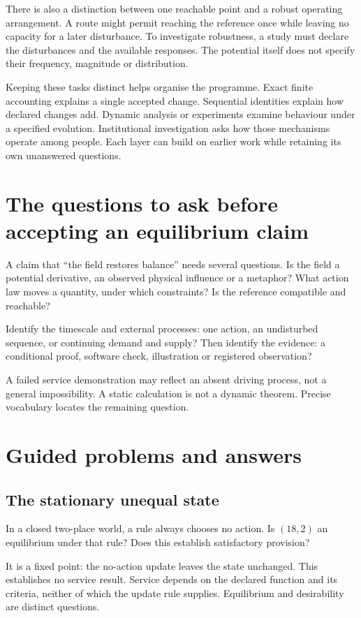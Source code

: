 There is also a distinction between one reachable point and a robust operating arrangement. A route might permit reaching the reference once while leaving no capacity for a later disturbance. To investigate robustness, a study must declare the disturbances and the available responses. The potential itself does not specify their frequency, magnitude or distribution.

Keeping these tasks distinct helps organise the programme. Exact finite accounting explains a single accepted change. Sequential identities explain how declared changes add. Dynamic analysis or experiments examine behaviour under a specified evolution. Institutional investigation asks how those mechanisms operate among people. Each layer can build on earlier work while retaining its own unanswered questions.

\section{The questions to ask before accepting an equilibrium claim}
A claim that ``the field restores balance'' needs several questions. Is the field a potential derivative, an observed physical influence or a metaphor? What action law moves a quantity, under which constraints? Is the reference compatible and reachable?

Identify the timescale and external processes: one action, an undisturbed sequence, or continuing demand and supply? Then identify the evidence: a conditional proof, software check, illustration or registered observation?

A failed service demonstration may reflect an absent driving process, not a general impossibility. A static calculation is not a dynamic theorem. Precise vocabulary locates the remaining question.

\section{Guided problems and answers}
\subsection{The stationary unequal state}
In a closed two-place world, a rule always chooses no action. Is $(18,2)$ an equilibrium under that rule? Does this establish satisfactory provision?

It is a fixed point: the no-action update leaves the state unchanged. This establishes no service result. Service depends on the declared function and its criteria, neither of which the update rule supplies. Equilibrium and desirability are distinct questions.

